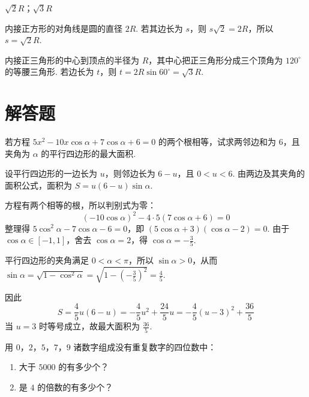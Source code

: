 \begin{answer}
\(\sqrt{2}R\)；\(\sqrt{3}R\)
\end{answer}

\begin{solution}
内接正方形的对角线是圆的直径 \(2R\). 若其边长为 \(s\)，则 \(s\sqrt{2}=2R\)，所以 \(s=\sqrt{2}R\).

内接正三角形的中心到顶点的半径为 \(R\)，其中心把正三角形分成三个顶角为 \(120^\circ\) 的等腰三角形. 若边长为 \(t\)，则
\(t=2R\sin60^\circ=\sqrt{3}R\).
\end{solution}

\section{解答题}

\begin{problem}
若方程 \(5x^2-10x\cos \alpha+7\cos \alpha+6=0\) 的两个根相等，试求两邻边和为 \(6\)，且夹角为 \(\alpha\) 的平行四边形的最大面积.
\end{problem}

\begin{solution}
设平行四边形的一边长为 \(u\)，则邻边长为 \(6-u\)，且 \(0<u<6\). 由两边及其夹角的面积公式，面积为 \(S=u(6-u)\sin\alpha\).

方程有两个相等的根，所以判别式为零：
\[
\left(-10\cos\alpha\right)^2-4\cdot5\left(7\cos\alpha+6\right)=0
\]
整理得 \(5\cos^2\alpha-7\cos\alpha-6=0\)，即
\(\left(5\cos\alpha+3\right)\left(\cos\alpha-2\right)=0\).
由于 \(\cos\alpha\in[-1,1]\)，舍去 \(\cos\alpha=2\)，得 \(\cos\alpha=-\frac{3}{5}\).

平行四边形的夹角满足 \(0<\alpha<\pi\)，所以 \(\sin\alpha>0\)，从而
\(\sin\alpha=\sqrt{1-\cos^2\alpha}=\sqrt{1-\left(-\frac{3}{5}\right)^2}=\frac{4}{5}\).

因此
\[
S=\frac{4}{5}u(6-u)=-\frac{4}{5}u^2+\frac{24}{5}u
=-\frac{4}{5}\left(u-3\right)^2+\frac{36}{5}
\]
当 \(u=3\) 时等号成立，故最大面积为 \(\frac{36}{5}\).
\end{solution}

\begin{problem}
用 \(0\)，\(2\)，\(5\)，\(7\)，\(9\) 诸数字组成没有重复数字的四位数中：

\begin{enumerate}
\item 大于 \(5000\) 的有多少个？
\item 是 \(4\) 的倍数的有多少个？
\end{enumerate}
\end{problem}

